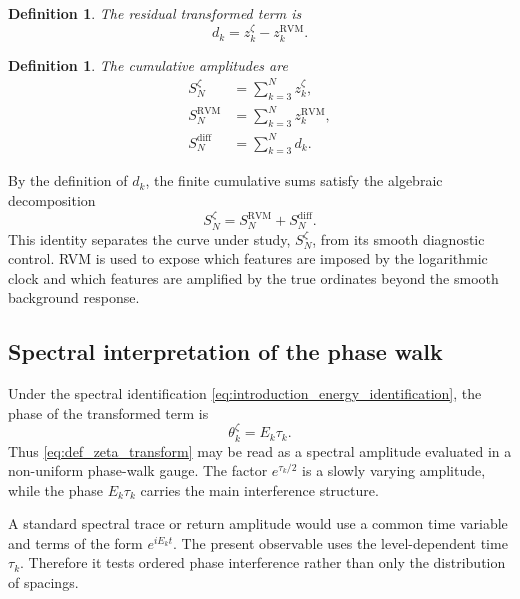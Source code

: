\documentclass[12pt]{article}
\numberwithin{equation}{section}
\newtheorem{definition}[theorem]{Definition}
\newcommand{\RVM}{\mathrm{RVM}}
\newcommand{\diff}{\mathrm{diff}}
\begin{document}
\begin{definition}
\label{def:residual_term}
The residual transformed term is
\begin{equation}
d_k
=
z_k^\zeta-z_k^{\RVM}.
\label{eq:def_residual_term}
\end{equation}
\end{definition}

\begin{definition}
\label{def:cumulative_amplitudes}
The cumulative amplitudes are
\begin{align}
S_N^\zeta
&=
\sum_{k=3}^{N}z_k^\zeta,
\label{eq:def_zeta_cumulative_amplitude}
\\
S_N^{\RVM}
&=
\sum_{k=3}^{N}z_k^{\RVM},
\label{eq:def_rvm_cumulative_amplitude}
\\
S_N^{\diff}
&=
\sum_{k=3}^{N}d_k.
\label{eq:def_diff_cumulative_amplitude}
\end{align}
\end{definition}


\noindent By the definition of \(d_k\), the finite cumulative sums satisfy the algebraic decomposition
\begin{equation}
S_N^\zeta
=
S_N^{\RVM}+S_N^{\diff}.
\end{equation}
This identity separates the curve under study, \(S_N^\zeta\), from its smooth diagnostic control.  RVM is used to expose which features are imposed by the logarithmic clock and which features are amplified by the true ordinates beyond the smooth background response.


\subsection{Spectral interpretation of the phase walk}
\label{sec:spectral_proper_time_interpretation}

\noindent Under the spectral identification \eqref{eq:introduction_energy_identification}, the phase of the transformed term is
\begin{equation}
\theta_k^\zeta
=
E_k\tau_k.
\label{eq:spectral_phase}
\end{equation}
Thus \eqref{eq:def_zeta_transform} may be read as a spectral amplitude evaluated in a non-uniform phase-walk gauge.  The factor \(e^{\tau_k/2}\) is a slowly varying amplitude, while the phase \(E_k\tau_k\) carries the main interference structure.


\noindent A standard spectral trace or return amplitude would use a common time variable and terms of the form \(e^{iE_kt}\).  The present observable uses the level-dependent time \(\tau_k\).  Therefore it tests ordered phase interference rather than only the distribution of spacings.
\end{document}
